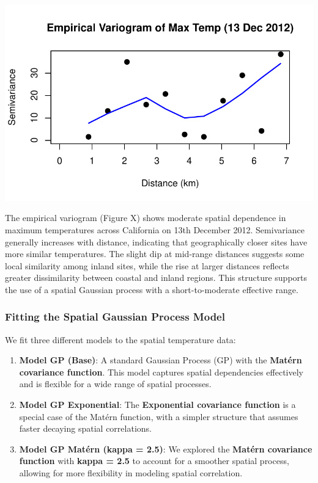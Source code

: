 \documentclass[
  11pt,
]{article}
\providecommand{\tightlist}{%
  \setlength{\itemsep}{0pt}\setlength{\parskip}{0pt}}\usepackage{longtable,booktabs,array}
\begin{document}
\includegraphics{project_files/figure-pdf/unnamed-chunk-74-1.pdf}

The empirical variogram (Figure X) shows moderate spatial dependence in
maximum temperatures across California on 13th December 2012.
Semivariance generally increases with distance, indicating that
geographically closer sites have more similar temperatures. The slight
dip at mid-range distances suggests some local similarity among inland
sites, while the rise at larger distances reflects greater dissimilarity
between coastal and inland regions. This structure supports the use of a
spatial Gaussian process with a short-to-moderate effective range.

\subsubsection{Fitting the Spatial Gaussian Process
Model}\label{fitting-the-spatial-gaussian-process-model}

We fit three different models to the spatial temperature data:

\begin{enumerate}
\def\labelenumi{\arabic{enumi}.}
\tightlist
\item
  \textbf{Model GP (Base)}: A standard Gaussian Process (GP) with the
  \textbf{Matérn covariance function}. This model captures spatial
  dependencies effectively and is flexible for a wide range of spatial
  processes.
\item
  \textbf{Model GP Exponential}: The \textbf{Exponential covariance
  function} is a special case of the Matérn function, with a simpler
  structure that assumes faster decaying spatial correlations.
\item
  \textbf{Model GP Matérn (kappa = 2.5)}: We explored the \textbf{Matérn
  covariance function} with \textbf{kappa = 2.5} to account for a
  smoother spatial process, allowing for more flexibility in modeling
  spatial correlation.
\end{enumerate}
\end{document}
